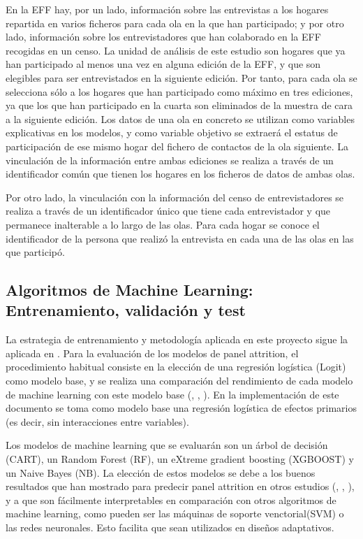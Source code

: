 En la EFF hay, por un lado, información sobre las entrevistas a los hogares repartida en varios ficheros para cada ola en la que han participado; y por otro lado, información sobre los entrevistadores que han colaborado en la EFF recogidas en un censo. La unidad de análisis de este estudio son hogares que ya han participado al menos una vez en alguna edición de la EFF, y que son elegibles para ser entrevistados en la siguiente edición. Por tanto, para cada ola se selecciona sólo a los hogares que han participado como máximo en tres ediciones, ya que los que han participado en la cuarta son eliminados de la muestra de cara a la siguiente edición. Los datos de una ola en concreto se utilizan como variables explicativas en los modelos, y como variable objetivo se extraerá el estatus de participación de ese mismo hogar del fichero de contactos de la ola siguiente. La vinculación de la información entre ambas ediciones se realiza a través de un identificador común que tienen los hogares en los ficheros de datos de ambas olas.

Por otro lado, la vinculación con la información del censo de entrevistadores se realiza a través de un identificador único que tiene cada entrevistador y que permanece inalterable a lo largo de las olas. Para cada hogar se conoce el identificador de la persona que realizó la entrevista en cada una de las olas en las que participó.

\subsection{Algoritmos de Machine Learning: Entrenamiento, validación y test}

La estrategia de entrenamiento y metodología aplicada en este proyecto sigue la aplicada en \cite{beste2023case}. Para la evaluación de los modelos de panel attrition, el procedimiento habitual consiste en la elección de una regresión logística (Logit) como modelo base, y se realiza una comparación del rendimiento de cada modelo de machine learning con este modelo base (\cite{lepkowski2002nonresponse}, \cite{kern2021predicting}, \cite{beste2023case}). En la implementación de este documento se toma como modelo base una regresión logística de efectos primarios (es decir, sin interacciones entre variables).

Los modelos de machine learning que se evaluarán son un árbol de decisión (CART), un Random Forest (RF), un eXtreme gradient boosting (XGBOOST) y un Naive Bayes (NB). La elección de estos modelos se debe a los buenos resultados que han mostrado para predecir panel attrition en otros estudios (\cite{kern2019tree}, \cite{kern2021predicting}, \cite{beste2023case}), y a que son fácilmente interpretables en comparación con otros algoritmos de machine learning, como pueden ser las máquinas de soporte venctorial(SVM) o las redes neuronales. Esto facilita que sean utilizados en diseños adaptativos.


